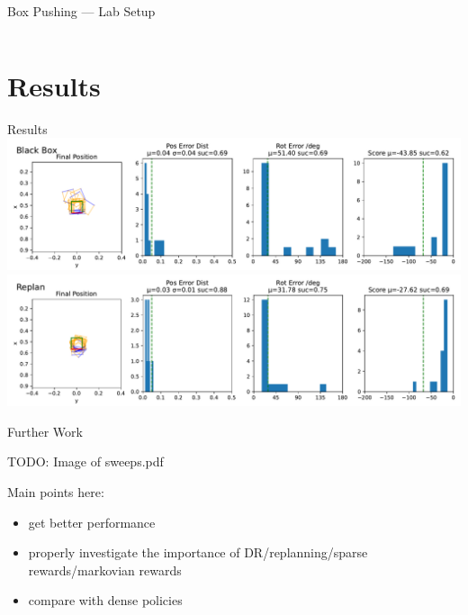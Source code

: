 \documentclass[16:9,en,navbarinfooter]{sdqbeamer}
\begin{document}
\begin{frame}{Box Pushing --- Lab Setup}
\begin{columns}
\begin{column}{0.35\textwidth}
    \end{column}
    \end{columns}

\end{frame}

\section{Results}
\begin{frame}{Results}
\center
    \includegraphics[width=.7\linewidth]{media/blackbox_presentation.pdf}\\
    \includegraphics[width=.7\linewidth]{media/replan_presentation.pdf}
\end{frame}

\begin{frame}{Further Work}

    TODO: Image of sweeps.pdf

    Main points here: 
    \begin{itemize}
            \item get better performance
            \item properly investigate the importance of DR/replanning/sparse rewards/markovian rewards
            \item compare with dense policies
    \end{itemize}


    
\end{frame}


\appendix
\beginbackup{}
\backupend{}
\end{document}
